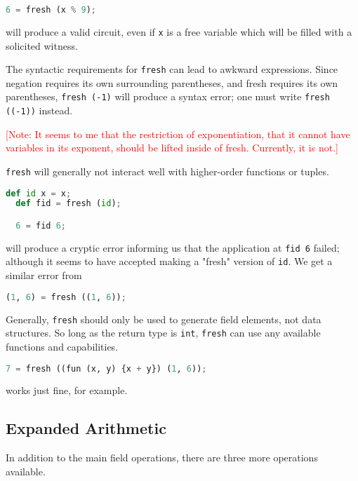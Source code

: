 \begin{lstlisting}[language=Python]
  6 = fresh (x % 9);
\end{lstlisting}

will produce a valid circuit, even if \lstinline|x| is a free variable which will be filled with a solicited witness.

The syntactic requirements for \lstinline{fresh} can lead to awkward expressions. Since negation requires its own surrounding parentheses, and fresh requires its own parentheses, \lstinline{fresh (-1)} will produce a syntax error; one must write \lstinline{fresh ((-1))} instead.

\textcolor{red}{[Note: It seems to me that the restriction of exponentiation, that it cannot have variables in its exponent, should be lifted inside of fresh. Currently, it is not.]}

\lstinline{fresh} will generally not interact well with higher-order functions or tuples.

\begin{lstlisting}[language=Python]
  def id x = x;
  def fid = fresh (id);

  6 = fid 6;
\end{lstlisting}

will produce a cryptic error informing us that the application at \lstinline{fid 6} failed; although it seems to have accepted making a "fresh" version of \lstinline{id}. We get a similar error from

\begin{lstlisting}[language=Python]
  (1, 6) = fresh ((1, 6));
\end{lstlisting}

Generally, \lstinline{fresh} should only be used to generate field elements, not data structures. So long as the return type is \lstinline{int}, \lstinline{fresh} can use any available functions and capabilities.

\begin{lstlisting}[language=Python]
  7 = fresh ((fun (x, y) {x + y}) (1, 6));
\end{lstlisting}

works just fine, for example.

\subsection{Expanded Arithmetic} \label{EXAR}

In addition to the main field operations, there are three more operations available.

